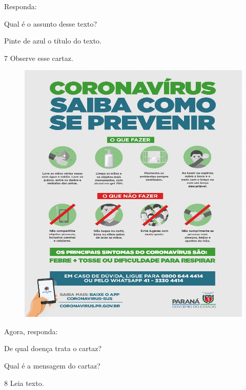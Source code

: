 Responda:

\begin{escolha}
\item Qual é o assunto desse texto?


\item Pinte de azul o título do texto.
\end{escolha}

\num{7} Observe esse cartaz.


\begin{figure}[htpb!]
\centering
\includegraphics[width=.6\textwidth]{media/image120.jpeg}
\end{figure}


Agora, responda:

\begin{escolha}
\item De qual doença trata o cartaz?


\item Qual é a mensagem do cartaz?

\end{escolha}

\num{8} Leia texto.

